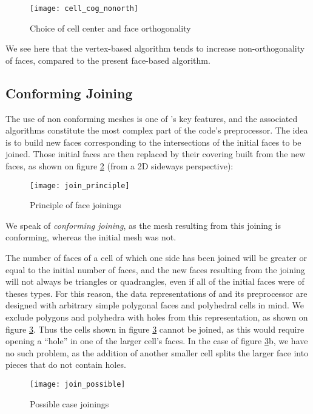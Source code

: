 \begin{figure}[!h]
\centerline{
\texttt{[image: cell\_cog\_nonorth]}}
\caption{Choice of cell center and face orthogonality}
\label{fig:algo.cog_cel.nonorth}
\end{figure}

We see here that the vertex-based algorithm tends to increase
non-orthogonality of faces, compared to the present
face-based algorithm.

\subsection{Conforming Joining\label{sec:join}}

The use of non conforming meshes is one of \CS's key features, and
the associated algorithms constitute the most complex part of the
code's preprocessor. The idea is to build new faces corresponding to
the intersections of the initial faces to be joined.
Those initial faces are then replaced by their covering built
from the new faces, as shown on figure \ref{fig:algo.join.principle}
(from a 2D sideways perspective):

\begin{figure}[!h]
\centerline{
\texttt{[image: join\_principle]}}
\caption{Principle of face joinings}
\label{fig:algo.join.principle}
\end{figure}

We speak of \emph{conforming joining}, as the mesh resulting from
this joining is conforming, whereas the initial mesh was not.

The number of faces of a cell of which one side has been joined will
be greater or equal to the initial number of faces, and the new faces
resulting from the joining will not always be triangles or quadrangles,
even if all of the initial faces were of theses types. For this
reason, the data representations of \CS and its preprocessor
are designed with arbitrary simple polygonal faces and polyhedral
cells in mind. We exclude polygons and polyhedra with holes from
this representation, as shown on figure \ref{fig:algo.join.possible}.
Thus the cells shown in figure \ref{fig:algo.join.possible} cannot be
joined, as this would require opening a ``hole'' in one of the larger
cell's faces. In the case of figure \ref{fig:algo.join.possible}b, we
have no such problem, as the addition of another smaller cell
splits the larger face into pieces that do not contain holes.

\begin{figure}[!h]
\centerline{
\texttt{[image: join\_possible]}}
\caption{Possible case joinings}
\label{fig:algo.join.possible}
\end{figure}

